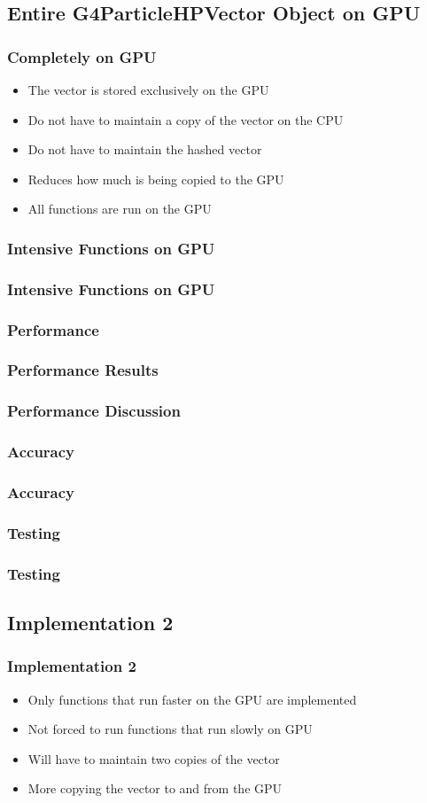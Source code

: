 \documentclass{beamer}
\newcommand\pro{\item[$+$]}
\newcommand\con{\item[$-$]}
\begin{document}
\subsection{Entire G4ParticleHPVector Object on GPU}
\begin{frame}
\frametitle{Completely on GPU}
\begin{itemize}
\item The vector is stored exclusively on the GPU
\pro Do not have to maintain a copy of the vector on the CPU
\pro Do not have to maintain the hashed vector
\pro Reduces how much is being copied to the GPU
\con All functions are run on the GPU
\end{itemize}
\end{frame}

\subsubsection{Intensive Functions on GPU}
\begin{frame}
\frametitle{Intensive Functions on GPU}
\end{frame}

\subsubsection{Performance}
\begin{frame}
\frametitle{Performance Results}
\end{frame}

\begin{frame}
\frametitle{Performance Discussion}
\end{frame}

\subsubsection{Accuracy}
\begin{frame}
\frametitle{Accuracy}
\end{frame}

\subsubsection{Testing}
\begin{frame}
\frametitle{Testing}
\end{frame}

\subsection{Implementation 2}
\begin{frame}
\frametitle{Implementation 2}
\begin{itemize}
\pro Only functions that run faster on the GPU are implemented
\pro Not forced to run functions that run slowly on GPU
\con Will have to maintain two copies of the vector
\con More copying the vector to and from the GPU
\end{itemize}
\end{frame}
\end{document}
